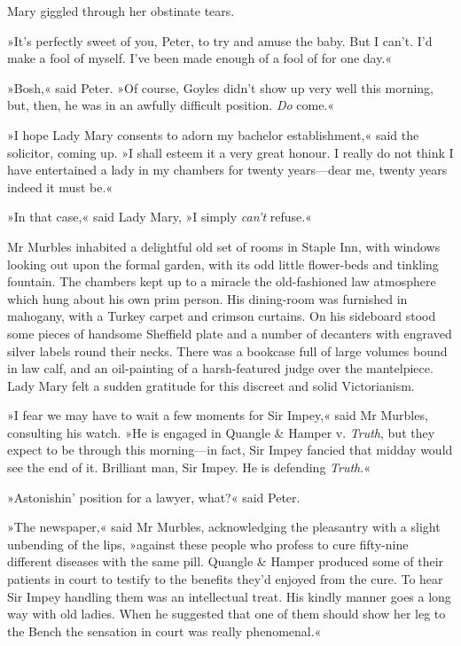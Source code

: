 Mary giggled through her obstinate tears.

»It's perfectly sweet of you, Peter, to try and amuse the baby. But I can't. I'd make a fool of myself. I've been made enough of a fool of for one day.«

»Bosh,« said Peter. »Of course, Goyles didn't show up very well this morning, but, then, he was in an awfully difficult position. \textit{Do} come.«

»I hope Lady Mary consents to adorn my bachelor establishment,« said the solicitor, coming up. »I shall esteem it a very great honour. I really do not think I have entertained a lady in my chambers for twenty years\allowbreak---\allowbreak dear me, twenty years indeed it must be.«

»In that case,« said Lady Mary, »I simply \textit{can't} refuse.«

Mr Murbles inhabited a delightful old set of rooms in Staple Inn, with windows looking out upon the formal garden, with its odd little flower-beds and tinkling fountain. The chambers kept up to a miracle the old-fashioned law atmosphere which hung about his own prim person.  His dining-room was furnished in mahogany, with a Turkey carpet and crimson curtains. On his sideboard stood some pieces of handsome Sheffield plate and a number of decanters with engraved silver labels round their necks. There was a bookcase full of large volumes bound in law calf, and an oil-painting of a harsh-featured judge over the mantelpiece. Lady Mary felt a sudden gratitude for this discreet and solid Victorianism.

»I fear we may have to wait a few moments for Sir Impey,« said Mr  Murbles, consulting his watch. »He is engaged in Quangle \& Hamper v.  \textit{Truth}, but they expect to be through this morning\allowbreak---\allowbreak in fact, Sir Impey fancied that midday would see the end of it. Brilliant man, Sir Impey.  He is defending \textit{Truth}.«

»Astonishin' position for a lawyer, what?« said Peter.

»The newspaper,« said Mr Murbles, acknowledging the pleasantry with a slight unbending of the lips, »against these people who profess to cure fifty-nine different diseases with the same pill. Quangle \& Hamper produced some of their patients in court to testify to the benefits they'd enjoyed from the cure. To hear Sir Impey handling them was an intellectual treat. His kindly manner goes a long way with old ladies.  When he suggested that one of them should show her leg to the Bench the sensation in court was really phenomenal.«

